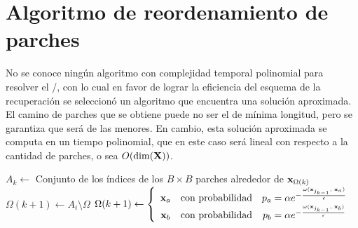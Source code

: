\section{Algoritmo de reordenamiento de parches}

No se conoce ningún algoritmo con complejidad temporal polinomial para resolver el \TSP/, con lo cual en favor de lograr la eficiencia del esquema de la recuperaci\'on se seleccion\'o un algoritmo que encuentra una soluci\'on aproximada. El camino de parches que se obtiene puede no ser el de m\'inima longitud, pero se garantiza que ser\'a de las menores. En cambio, esta soluci\'on aproximada se computa en un tiempo polinomial, que en este caso ser\'a lineal con respecto a la cantidad de parches, o sea $O(\dim(\mathbf{X}))$.

\begin{algorithm}[h]
	\BlankLine
	 {
		$A_k \gets $ Conjunto de los \'indices de los $B \times B$ parches alrededor de $\mathbf{x}_{\Omega(k)}$\;
		 {
			$\Omega(k + 1) \gets A_i \setminus \Omega$\;
		}{
			$\Omega(k + 1) \gets \left\{
				\begin{array}{ccc}
				\mathbf{x}_a &\mbox{con probabilidad}& p_a = \alpha e^{-\frac{\omega(\mathbf{x}_{j_{k - 1}},\; \mathbf{x}_a)}{\epsilon}}\\
				\mathbf{x}_b &\mbox{con probabilidad}& p_b = \alpha e^{-\frac{\omega(\mathbf{x}_{j_{k - 1}},\; \mathbf{x}_b)}{\epsilon}}\\
				\end{array}
			\right.$\;
		}
	}
	\Return{$\Omega$}\;
	\caption{Reordenamiento de parches.}
	\label{al:PRA}
\end{algorithm}

